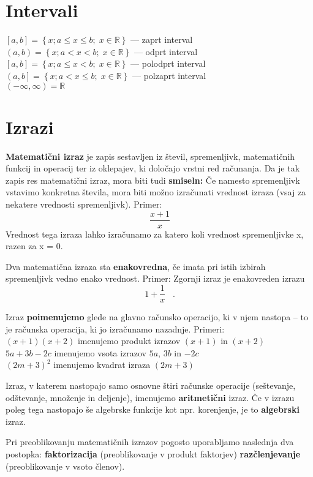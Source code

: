 \documentclass[a4paper,oneside,12pt,fleqn]{article}
\def\R{\ensuremath{\mathbb R}}
\newcommand{\edot}{\;\;\;.}
\numberwithin{equation}{section}
\begin{document}
\section{Intervali}
$\left[a,b \right] = \left\{x; a \leq x \leq b; \; x \in \R \right\}$ --- zaprt interval \\
$\left(a,b \right) = \left\{x; a < x < b; \; x \in \R \right\}$ --- odprt interval \\
$\left[a,b \right] = \left\{x; a \leq x < b; \; x \in \R \right\}$ --- polodprt interval \\
$\left(a,b \right] = \left\{x; a < x \leq b; \; x \in \R \right\}$ --- polzaprt interval \\
$(-\infty,\infty) = \R$

\section{Izrazi}
\textbf{Matematični izraz} je zapis sestavljen iz števil, spremenljivk, matematičnih funkcij in
operacij ter iz oklepajev, ki določajo vrstni red računanja. Da je tak zapis res
matematični izraz, mora biti tudi \textbf{smiseln:} Če namesto spremenljivk vstavimo konkretna
števila, mora biti možno izračunati vrednost izraza (vsaj za nekatere vrednosti
spremenljivk).
Primer:
\[ \frac{x + 1}{x} \]
Vrednost tega izraza lahko izračunamo za katero koli vrednost
spremenljivke x, razen za x = 0.

Dva matematična izraza sta \textbf{enakovredna}, če imata pri istih izbirah spremenljivk vedno
enako vrednost.
Primer: Zgornji izraz je enakovreden izrazu 
\[ 1 + \frac{1}{x} \edot \]

Izraz \textbf{poimenujemo} glede na glavno računsko operacijo, ki v njem nastopa -- to je računska
operacija, ki jo izračunamo nazadnje.
Primeri: \\
$(x + 1)(x + 2)$ imenujemo produkt izrazov $(x + 1)$ in $(x + 2)$ \\
$5a + 3b - 2c$ imenujemo vsota izrazov $5a$, $3b$ in $-2c$ \\
$(2m + 3)^2$ imenujemo kvadrat izraza $(2m + 3)$

Izraz, v katerem nastopajo samo osnovne štiri računske operacije (seštevanje, odštevanje,
množenje in deljenje), imenujemo \textbf{aritmetični} izraz. Če v izrazu poleg tega nastopajo še
algebrske funkcije kot npr. korenjenje, je to \textbf{algebrski} izraz.

Pri preoblikovanju matematičnih izrazov pogosto uporabljamo naslednja dva postopka:
\textbf{faktorizacija} (preoblikovanje v produkt faktorjev)
\textbf{razčlenjevanje} (preoblikovanje v vsoto členov).
\end{document}
